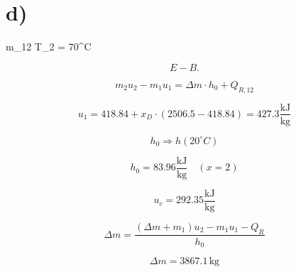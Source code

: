 

\section*{d)}

 \quad \Delta m_{12} \quad \Rightarrow \quad T_2 = 70^\circ C

\[
E - B.
\]

\[
m_2 u_2 - m_1 u_1 = \Delta m \cdot h_0 + Q_{R,12}
\]

\[
u_1 = 418.84 + x_D \cdot (2506.5 - 418.84) = 427.3 \frac{\text{kJ}}{\text{kg}}
\]

\[
h_0 \Rightarrow h(20^\circ C)
\]

\[
h_0 = 83.96 \frac{\text{kJ}}{\text{kg}} \quad (x=2)
\]

\[
u_c = 292.35 \frac{\text{kJ}}{\text{kg}}
\]

\[
\Delta m = \frac{(\Delta m + m_1) u_2 - m_1 u_1 - Q_R}{h_0}
\]

\[
\Delta m = 3867.1 \, \text{kg}
\]